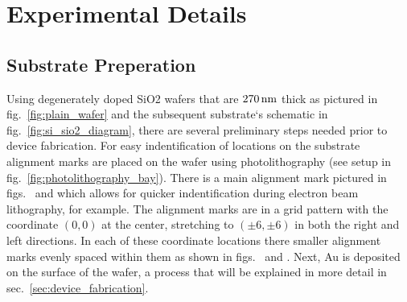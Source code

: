 \chapter{Experimental Details}\label{chap:exp_details}

\section{Substrate Preperation}\label{sec:sample_prep}
Using degenerately doped \ac{SiO2} wafers that are $270\,\mathrm{nm}$ thick as pictured in fig.~\ref{fig:plain_wafer} and the subsequent substrate`s schematic in fig.~\ref{fig:si_sio2_diagram}, there are several preliminary steps needed prior to device fabrication. For easy indentification of locations on the substrate alignment marks are placed on the wafer using photolithography (see setup in fig.~\ref{fig:photolithography_bay}). There is a main alignment mark pictured in figs.~ and  which allows for quicker indentification during electron beam lithography, for example. The alignment marks are in a grid pattern with the coordinate $\left(0,0\right)$ at the center, stretching to $\left(\pm 6,\pm 6\right)$ in both the right and left directions. In each of these coordinate locations there smaller alignment marks evenly spaced within them as shown in figs.~ and . Next, \ac{Au} is deposited on the surface of the wafer, a process that will be explained in more detail in sec.~\ref{sec:device_fabrication}.
